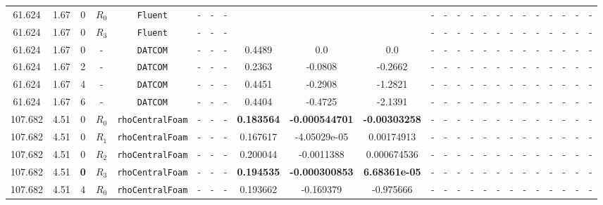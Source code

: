 \documentclass[12pt]{article}
\begin{document}
\begin{table}[H]
{\begin{tabular}{ccccc|ccc|ccc|ccc|ccc|ccccccc}
        \rowcolor{red!10}
        61.624 & 1.67 & 0 & $R_0$ & \texttt{Fluent} & - & - & - &  &  &  & - & - & - & - & - & - & - & - & - & - & - & - & - \\ 
        \rowcolor{red!40}
        61.624 & 1.67 & 0 & $R_3$ & \texttt{Fluent} & - & - & - &  &  &  & - & - & - & - & - & - & - & - & - & - & - & - & - \\ 
        \rowcolor{gray!10}
        61.624 & 1.67 & 0 & - & \texttt{DATCOM} & - & - & - & 0.4489 & 0.0 & 0.0 & - & - & - & - & - & - & - & - & - & - & - & - & - \\ 
        \rowcolor{gray!10}
        61.624 & 1.67 & 2 & - & \texttt{DATCOM} & - & - & - & 0.2363 & -0.0808 & -0.2662 & - & - & - & - & - & - & - & - & - & - & - & - & - \\ 
        \rowcolor{gray!10}
        61.624 & 1.67 & 4 & - & \texttt{DATCOM} & - & - & - & 0.4451 & -0.2908 & -1.2821 & - & - & - & - & - & - & - & - & - & - & - & - & - \\ \hline
        \rowcolor{gray!10}
        61.624 & 1.67 & 6 & - & \texttt{DATCOM} & - & - & - & 0.4404 & -0.4725 & -2.1391 & - & - & - & - & - & - & - & - & - & - & - & - & - \\ \hline
        \rowcolor{green!10}
        107.682 & 4.51 & 0 & $R_0$ & \texttt{rhoCentralFoam} & - & - & - & \textbf{0.183564} & \textbf{-0.000544701} & \textbf{-0.00303258} & - & - & - & - & - & - & - & - & - & - & - & - & - \\ 
        \rowcolor{green!20}
        107.682 & 4.51 & 0 & $R_1$ & \texttt{rhoCentralFoam} & - & - & - & 0.167617 & -4.05029e-05 & 0.00174913 & - & - & - & - & - & - & - & - & - & - & - & - & - \\
        \rowcolor{green!30}
        107.682 & 4.51 & 0 & $R_2$ & \texttt{rhoCentralFoam} & - & - & - & 0.200044 & -0.0011388 & 0.000674536 & - & - & - & - & - & - & - & - & - & - & - & - & - \\
        \rowcolor{green!40}
        107.682 & 4.51 & \cellcolor{lime}\textbf{0} & \cellcolor{cyan}$R_3$ & \texttt{rhoCentralFoam} & - & - & - & \textbf{0.194535} & \textbf{-0.000300853} & \textbf{6.68361e-05} & - & - & - & - & - & - & - & - & - & - & - & - & - \\
        \rowcolor{green!10}
        107.682 & 4.51 & {4} & $R_0$ & \texttt{rhoCentralFoam} & - & - & - & 0.193662 & -0.169379 & -0.975666 & - & - & - & - & - & - & - & - & - & - & - & - & - \\

\end{tabular}}
\end{table}
\end{document}

